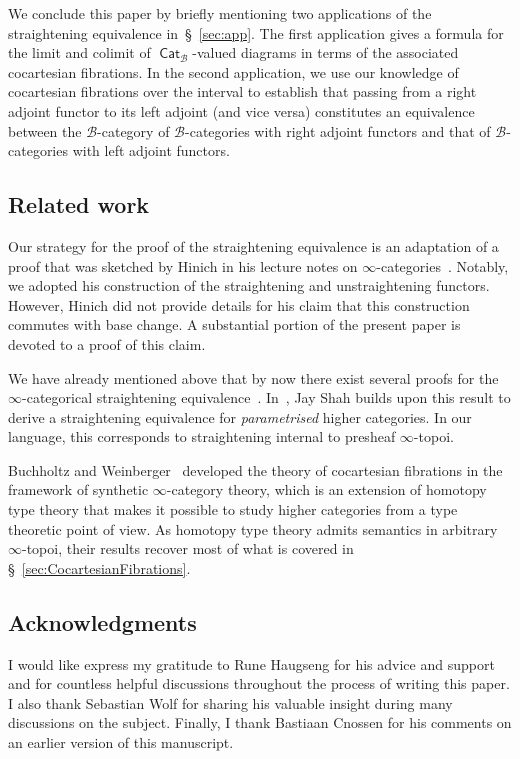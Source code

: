 \documentclass[reqno]{amsart}
\numberwithin{equation}{subsection}
\theoremstyle{plain}
\theoremstyle{definition}
\let\scr=\mathcal
\def\BB{\scr B}
\DeclareMathOperator{\ICat}{\mathsf{Cat}}
\begin{document}
We conclude this paper by briefly mentioning two applications of the straightening equivalence in~\S~\ref{sec:app}. The first application gives a formula for the limit and colimit of $\ICat_{\BB}$-valued diagrams in terms of the associated cocartesian fibrations. In the second application, we use our knowledge of cocartesian fibrations over the interval to establish that passing from a right adjoint functor to its left adjoint (and vice versa) constitutes an equivalence between the $\BB$-category of $\BB$-categories with right adjoint functors and that of $\BB$-categories with left adjoint functors.

\subsection*{Related work}
Our strategy for the proof of the straightening equivalence is an adaptation of a proof that was sketched by Hinich in his lecture notes on $\infty$-categories~\cite{Hinich2017}. Notably, we adopted his construction of the straightening and unstraightening functors. However, Hinich did not provide details for his claim that this construction commutes with base change. A substantial portion of the present paper is devoted to a proof of this claim.

We have already mentioned above that by now there exist several proofs for the $\infty$-categorical straightening equivalence~\cite{htt, BoavidadeBrito2018, Nuiten2021, Hebestreit2021, Rasekh2021b}. In~\cite{Shah2018}, Jay Shah builds upon this result to derive a straightening equivalence for \emph{parametrised} higher categories. In our language, this corresponds to straightening internal to presheaf $\infty$-topoi.

Buchholtz and Weinberger~\cite{Buchholtz2021} developed the theory of cocartesian fibrations in the framework of synthetic $\infty$-category theory, which is an extension of homotopy type theory that makes it possible to study higher categories from a type theoretic point of view. As homotopy type theory admits semantics in arbitrary $\infty$-topoi, their results recover most of what is covered in \S~\ref{sec:CocartesianFibrations}.

\subsection*{Acknowledgments}
I would like express my gratitude to Rune Haugseng for his advice and support and for countless helpful discussions throughout the process of writing this paper. I also thank Sebastian Wolf for sharing his valuable insight during many discussions on the subject. Finally, I thank Bastiaan Cnossen for his comments on an earlier version of this manuscript.
\end{document}
